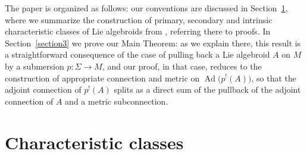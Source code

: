 \documentclass[11pt]{article}
\numberwithin{equation}{section}
\newcommand{\8}{\infty}
\begin{document}
The paper is organized as follows: our conventions are discussed in Section~\ref{sec : Characteristic classes}, where we summarize the construction of primary, secondary and intrinsic characteristic classes of Lie algebroids from \cite{CrainicNL,CrFer_Char}, referring there to proofs. In Section~\ref{section3} we prove our Main Theorem: as we explain there, this result is a straightforward consequence of the case of pulling back a Lie algebroid $A$ on $M$ by a submersion $p\colon \Sigma\to M$, and our proof, in that case, reduces to the construction of appropriate connection and metric on $\operatorname{Ad}\big(p^!(A)\big)$, so that the adjoint connection of $p^!(A)$ splits as a direct sum of the pullback of the adjoint connection of $A$ and a metric subconnection.

\section{Characteristic classes}\label{sec : Characteristic classes}
\end{document}
